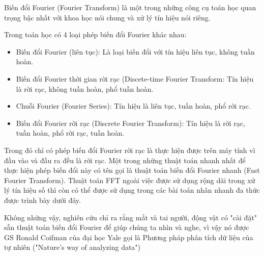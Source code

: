 \documentclass[../report.tex]{subfiles}
\begin{document}
Biến đổi Fourier (Fourier Transform) là một trong những công 
cụ toán học quan trọng bậc nhất với khoa học nói chung 
và xử lý tín hiệu nói riêng. 

Trong toán học có 4 loại phép biến đổi Fourier khác nhau: 
\begin{itemize}
    \item Biến đổi Fourier (liên tục): Là loại biến đổi 
        với tín hiệu liên tục, không tuần hoàn. 
    \item Biến đổi Fourier thời gian rời rạc (Discete-time 
            Fourier Transform: Tín hiệu là rời rạc, không tuần hoàn, 
            phổ tuần hoàn. 
    \item Chuỗi Fourier (Fourier Series):
        Tín hiệu là liên tục, tuần hoàn, phổ rời rạc. 
    \item Biến đổi Fourier rời rạc (Discrete Fourier Transform): 
        Tín hiệu là rời rạc, tuần hoàn, phổ rời rạc, tuần hoàn. 
\end{itemize}

Trong đó chỉ có phép biến đổi Fourier rời rạc là thực hiện 
được trên máy tính vì đầu vào và đầu ra đều là rời rạc. Một trong
những thuật toán 
nhanh nhất để thực hiện phép biến đổi này có tên gọi là thuật toán 
biến đổi Fourier nhanh (Fast Fourier Transform). Thuật toán FFT 
ngoài việc được sử dụng rộng dãi trong xử lý tín hiệu số thì còn 
có thể được sử dụng trong các bài toán nhân nhanh đa thức được 
trình bày dưới đây. 

Không những vậy, nghiên cứu chỉ ra rằng mắt và tai người, 
động vật có "cài đặt" sẵn thuật toán biến đổi 
Fourier để giúp chúng ta nhìn và nghe, 
vì vậy nó được GS Ronald Coifman của đại học Yale 
gọi là Phương pháp phân tích dữ liệu của 
tự nhiên ("Nature's way of analyzing data") 
\cite{vnoi-fft} \cite{fourier-transform}
\end{document}
